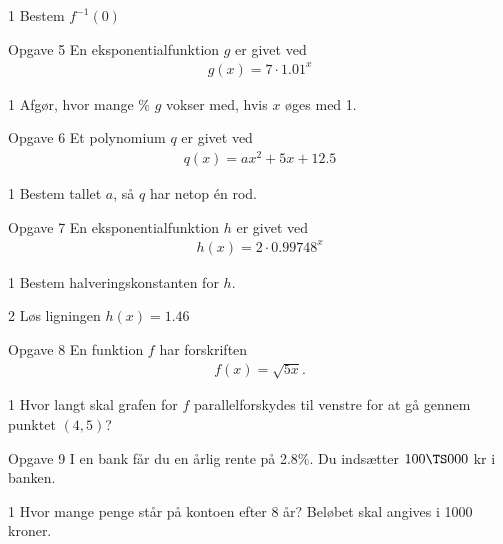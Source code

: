 \begin{delopgave}{1}
	Bestem $f^{-1}(0)$
\end{delopgave}
%
%
\begin{opgavetekst}{Opgave 5}
	En eksponentialfunktion $g$ er givet ved
	\begin{align*}
		g(x) = 7\cdot 1.01^x
	\end{align*}
\end{opgavetekst}
\begin{delopgave}{1}
	Afgør, hvor mange $\%$ $g$ vokser med, hvis $x$ øges med 1. 
\end{delopgave}
%
%
\begin{opgavetekst}{Opgave 6}
	Et polynomium $q$ er givet ved
	\begin{align*}
		q(x) = ax^2 + 5x + 12.5
	\end{align*}
\end{opgavetekst}
\begin{delopgave}{1}
	Bestem tallet $a$, så $q$ har netop én rod. 
\end{delopgave}
%
%
\begin{opgavetekst}{Opgave 7}
	En eksponentialfunktion $h$ er givet ved
	\begin{align*}
		h(x) = 2\cdot 0.99748^x
	\end{align*}
\end{opgavetekst}
\begin{delopgave}{1}
	Bestem halveringskonstanten for $h$.
\end{delopgave}
\begin{delopgave}{2}
	Løs ligningen $h(x) = 1.46$
\end{delopgave}
%
%
\begin{opgavetekst}{Opgave 8}
	En funktion $f$ har forskriften
	\begin{align*}
		f(x) = \sqrt{5x}.
	\end{align*}
\end{opgavetekst}
\begin{delopgave}{1}
	Hvor langt skal grafen for $f$ parallelforskydes til venstre for at gå gennem punktet $(4,5)$? 
\end{delopgave}
%
%
\begin{opgavetekst}{Opgave 9}
	I en bank får du en årlig rente på 2.8$\%$. Du indsætter $100\TS 000$ kr i banken.
\end{opgavetekst}
\begin{delopgave}{1}
	Hvor mange penge står på kontoen efter 8 år? Beløbet skal angives i 1000 kroner. 
\end{delopgave}
